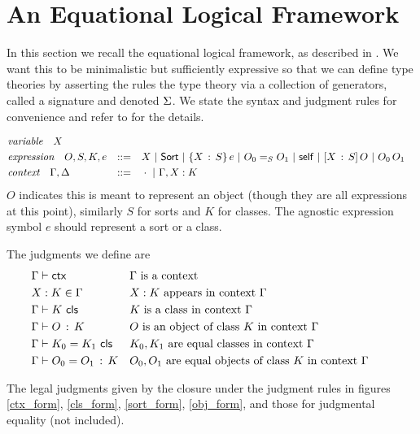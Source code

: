 \section{An Equational Logical Framework}
In this section we recall the equational logical framework,
as described in \cite{harper2021equational}.
We want this to be minimalistic but sufficiently expressive so that we can define type theories by asserting the rules the type theory
via a collection of generators, called a signature and denoted $\Si$.
We state the syntax and judgment rules for convenience and refer to \cite{harper2021equational} for the details.

\begin{align*}
  &\textit{variable} \quad X  \\
  &\textit{expression} \quad O, S, K, e &::= \quad & X \BNFSep \SortCS \BNFSep \PiCS{X}{S}{e}
                                     \BNFSep \EqCS{S}{O_{0}}{O_{1}} \BNFSep \SelfCS \BNFSep \LamCS{X}{S}{O} \BNFSep \ApCS{O_{0}}{O_{1}} \\
  &\textit{context} \quad \Ga, \De &::= \quad & \cdot \BNFSep \CtxExt{\Ga}{X}{K}
\end{align*}
$O$ indicates this is meant to represent an object
(though they are all expressions at this point),
similarly $S$ for sorts and $K$ for classes.
The agnostic expression symbol $e$ should represent a sort or a class.

The judgments we define are
\begin{align*}
  &\CtxJdg{\Ga} && \Ga \text{ is a context }  \\
  &X:K \in \Ga && X:K \text{ appears in context } \Ga \\
  &\ClsJdg{\Ga}{K} && K \text{ is a class in context } \Ga \\
  &\ObjJdg{\Ga}{O}{K} && O \text{ is an object of class } K
    \text{ in context } \Ga && \\
  &\IdClsJdg{\Ga}{K_{0}}{K_{1}} && K_{0}, K_{1}
    \text{ are equal classes in context } \Ga \\
  &\IdObjJdg{\Ga}{O_{0}}{O_{1}}{K} && O_{0},O_{1}
    \text{ are equal objects of class } K
    \text{ in context } \Ga
\end{align*}

The legal judgments given by the closure under the judgment rules
in figures \ref{ctx_form}, \ref{cls_form}, \ref{sort_form}, \ref{obj_form},
and those for judgmental equality (not included).

